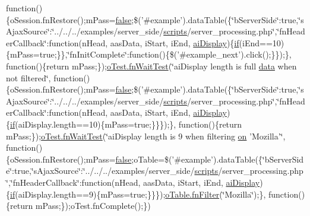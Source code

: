 \begin{DoxyCompactItemize}
function()\{o\+Session.\+fn\+Restore();m\+Pass=\hyperlink{validate_8js_a5df37b7f02e5cdc7d9412b7f872b8e01}{false};\$('\#example').data\+Table(\{\char`\"{}b\+Server\+Side\char`\"{}\+:true,\char`\"{}s\+Ajax\+Source\char`\"{}\+:\char`\"{}../../../examples/server\+\_\+side/\hyperlink{tinymce_8jquery_8dev_8js_a09066d4d580eeec222f858d588b4cdef}{scripts}/server\+\_\+processing.\+php\char`\"{},\char`\"{}fn\+Header\+Callback\char`\"{}\+:function(n\+Head, aas\+Data, i\+Start, i\+End, \hyperlink{core_8constructor_8js_ab6500ff83985151859ca3105a6eb888c}{ai\+Display})\{\hyperlink{fullpage_2plugin_8js_a8b98017e64ef036adb9ae327ff94abe1}{if}(i\+End==10)\{m\+Pass=true;\}\},\char`\"{}fn\+Init\+Complete\char`\"{}\+:function()\{\$('\#example\+\_\+next').click();\}\});\}, function()\{return m\+Pass;\});\hyperlink{onhold_24__server-side_2__zero__config_8js_ab25c4d596771c0133cdc45178ce72c3d}{o\+Test.\+fn\+Wait\+Test}(\char`\"{}ai\+Display length is full \hyperlink{fullpage_2plugin_8js_a718c1bf5a3bf21ebb980203b142e5b75}{data} when not filtered\char`\"{}, function()\{o\+Session.\+fn\+Restore();m\+Pass=\hyperlink{validate_8js_a5df37b7f02e5cdc7d9412b7f872b8e01}{false};\$('\#example').data\+Table(\{\char`\"{}b\+Server\+Side\char`\"{}\+:true,\char`\"{}s\+Ajax\+Source\char`\"{}\+:\char`\"{}../../../examples/server\+\_\+side/\hyperlink{tinymce_8jquery_8dev_8js_a09066d4d580eeec222f858d588b4cdef}{scripts}/server\+\_\+processing.\+php\char`\"{},\char`\"{}fn\+Header\+Callback\char`\"{}\+:function(n\+Head, aas\+Data, i\+Start, i\+End, \hyperlink{core_8constructor_8js_ab6500ff83985151859ca3105a6eb888c}{ai\+Display})\{\hyperlink{fullpage_2plugin_8js_a8b98017e64ef036adb9ae327ff94abe1}{if}(ai\+Display.\+length==10)\{m\+Pass=true;\}\}\});\}, function()\{return m\+Pass;\});\hyperlink{onhold_24__server-side_2__zero__config_8js_ab25c4d596771c0133cdc45178ce72c3d}{o\+Test.\+fn\+Wait\+Test}(\char`\"{}ai\+Display length is 9 when filtering \hyperlink{fullpage_2plugin_8min_8js_a1cfa98b7fed2aaf9fee3b68dbb7f9497}{on} 'Mozilla'\char`\"{}, function()\{o\+Session.\+fn\+Restore();m\+Pass=\hyperlink{validate_8js_a5df37b7f02e5cdc7d9412b7f872b8e01}{false};o\+Table=\$('\#example').data\+Table(\{\char`\"{}b\+Server\+Side\char`\"{}\+:true,\char`\"{}s\+Ajax\+Source\char`\"{}\+:\char`\"{}../../../examples/server\+\_\+side/\hyperlink{tinymce_8jquery_8dev_8js_a09066d4d580eeec222f858d588b4cdef}{scripts}/server\+\_\+processing.\+php\char`\"{},\char`\"{}fn\+Header\+Callback\char`\"{}\+:function(n\+Head, aas\+Data, i\+Start, i\+End, \hyperlink{core_8constructor_8js_ab6500ff83985151859ca3105a6eb888c}{ai\+Display})\{\hyperlink{fullpage_2plugin_8js_a8b98017e64ef036adb9ae327ff94abe1}{if}(ai\+Display.\+length==9)\{m\+Pass=true;\}\}\});\hyperlink{api_8methods_8js_a7b6987d0a9ab9c5303d10ef62790885d}{o\+Table.\+fn\+Filter}(\char`\"{}Mozilla\char`\"{});\}, function()\{return m\+Pass;\});o\+Test.\+fn\+Complete();\})
\end{DoxyCompactItemize}


